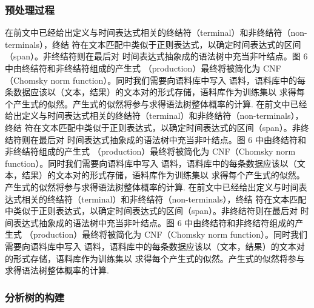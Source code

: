 \subsubsection{预处理过程}

在前文中已经给出定义与时间表达式相关的终结符（terminal）和非终结符（non-terminals），终结
符在文本匹配中类似于正则表达式，以确定时间表达式的区间（span）。非终结符则在最后对
时间表达式抽象成的语法树中充当非叶结点。图 6 中由终结符和非终结符组成的产生式
（production）最终将被简化为 CNF（Chomsky norm function）。同时我们需要向语料库中写入
语料，语料库中的每条数据应该以（文本，结果）的文本对的形式存储，语料库作为训练集以
求得每个产生式的似然。产生式的似然将参与求得语法树整体概率的计算.
在前文中已经给出定义与时间表达式相关的终结符（terminal）和非终结符（non-terminals），终结
符在文本匹配中类似于正则表达式，以确定时间表达式的区间（span）。非终结符则在最后对
时间表达式抽象成的语法树中充当非叶结点。图 6 中由终结符和非终结符组成的产生式
（production）最终将被简化为 CNF（Chomsky norm function）。同时我们需要向语料库中写入
语料，语料库中的每条数据应该以（文本，结果）的文本对的形式存储，语料库作为训练集以
求得每个产生式的似然。产生式的似然将参与求得语法树整体概率的计算.
在前文中已经给出定义与时间表达式相关的终结符（terminal）和非终结符（non-terminals），终结
符在文本匹配中类似于正则表达式，以确定时间表达式的区间（span）。非终结符则在最后对
时间表达式抽象成的语法树中充当非叶结点。图 6 中由终结符和非终结符组成的产生式
（production）最终将被简化为 CNF（Chomsky norm function）。同时我们需要向语料库中写入
语料，语料库中的每条数据应该以（文本，结果）的文本对的形式存储，语料库作为训练集以
求得每个产生式的似然。产生式的似然将参与求得语法树整体概率的计算.

\subsubsection{分析树的构建}

